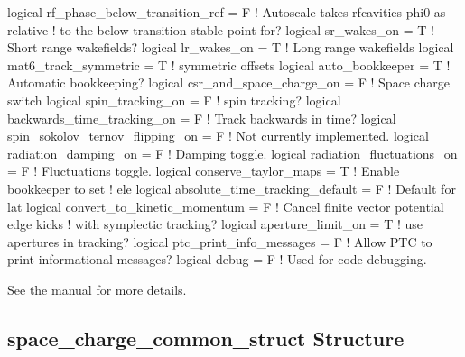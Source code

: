 {{{{{{{{{\begin{example}
    logical rf_phase_below_transition_ref = F   ! Autoscale takes rfcavities phi0 as relative
                                                !   to the below transition stable point for?
    logical sr_wakes_on = T                     ! Short range wakefields?
    logical lr_wakes_on = T                     ! Long range wakefields
    logical mat6_track_symmetric = T            ! symmetric offsets
    logical auto_bookkeeper = T                 ! Automatic bookkeeping?
    logical csr_and_space_charge_on = F         ! Space charge switch
    logical spin_tracking_on = F                ! spin tracking?
    logical backwards_time_tracking_on = F      ! Track backwards in time?
    logical spin_sokolov_ternov_flipping_on = F ! Not currently implemented.
    logical radiation_damping_on = F            ! Damping toggle.
    logical radiation_fluctuations_on = F       ! Fluctuations toggle.
    logical conserve_taylor_maps = T            ! Enable bookkeeper to set 
                                                !    ele%
    logical absolute_time_tracking_default = F  ! Default for lat%
    logical convert_to_kinetic_momentum = F     ! Cancel finite vector potential edge kicks 
                                                !    with symplectic tracking?
    logical aperture_limit_on = T               ! use apertures in tracking?
    logical ptc_print_info_messages = F         ! Allow PTC to print informational messages?
    logical debug = F                           ! Used for code debugging.
\end{example}
See the \bmad manual for more details.

\subsection{space\_charge\_common\_struct Structure}
\label{s:csr.param.struct} 

}}}}}}}}}
